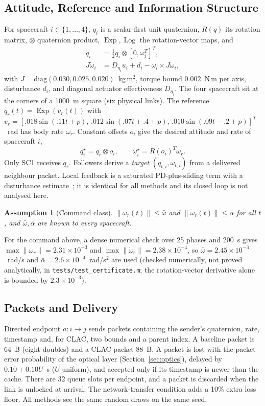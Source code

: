 \documentclass[journal]{IEEEtran}
\DeclareMathOperator{\Log}{Log}
\DeclareMathOperator{\Exp}{Exp}
\newtheorem{assumption}{Assumption}
\begin{document}
\subsection{Attitude, Reference and Information Structure}
For spacecraft $i\in\{1,\dots,4\}$, $q_i$ is a scalar-first unit quaternion, $R(q)$ its rotation matrix, $\otimes$ quaternion product, $\Exp,\Log$ the rotation-vector maps, and
\begin{align}
\dot q_i &= \tfrac12 q_i\otimes[0,\omega_i^T]^T,\\
J\dot\omega_i &= D_{\eta_i}u_i+d_i-\omega_i\times J\omega_i,
\end{align}
with $J=\mathrm{diag}(0.030,0.025,0.020)$~kg\,m$^2$, torque bound $0.002$~N\,m per axis, disturbance $d_i$, and diagonal actuator effectiveness $D_{\eta_i}$. The four spacecraft sit at the corners of a 1000~m square (six physical links). The reference $q_r(t)=\Exp(v_r(t))$ with $v_r=[.018\sin(.11t+p),\,.012\sin(.07t+.4+p),\,.010\sin(.09t-.2+p)]^T$~rad has body rate $\omega_r$. Constant offsets $o_i$ give the desired attitude and rate of spacecraft $i$,
\begin{equation}
q_i^\star=q_r\otimes o_i,\qquad \omega_i^\star=R(o_i)^T\omega_r .
\end{equation}
Only SC1 receives $q_r$. Followers derive a \emph{target} $(q_{t,i},\omega_{t,i})$ from a delivered neighbour packet. Local feedback is a saturated PD-plus-sliding term with a disturbance estimate~\cite{liu2018}; it is identical for all methods and its closed loop is not analysed here.

\begin{assumption}[Command class]\label{as:ref}
$\|\omega_r(t)\|\le\bar\omega$ and $\|\dot\omega_r(t)\|\le\bar\alpha$ for all $t$, and $\bar\omega,\bar\alpha$ are known to every spacecraft.
\end{assumption}
For the command above, a dense numerical check over 25 phases and 200~s gives $\max\|\omega_r\|=2.31\times10^{-3}$ and $\max\|\dot\omega_r\|=2.38\times10^{-4}$, so $\bar\omega=2.45\times10^{-3}$~rad/s and $\bar\alpha=2.6\times10^{-4}$~rad/s$^2$ are used (checked numerically, not proved analytically, in \texttt{tests/test\_certificate.m}; the rotation-vector derivative alone is bounded by $2.3\times10^{-3}$).

\subsection{Packets and Delivery}
Directed endpoint $a:i\to j$ sends packets containing the sender's quaternion, rate, timestamp and, for CLAC, two bounds and a parent index. A baseline packet is 64~B (eight doubles) and a CLAC packet 88~B. A packet is lost with the packet-error probability of the optical layer (Section~\ref{sec:optics}), delayed by $0.10+0.10U$~s ($U$ uniform), and accepted only if its timestamp is newer than the cache. There are 32 queue slots per endpoint, and a packet is discarded when the link is unlocked at arrival. The network-transfer condition adds a 10\% extra loss floor. All methods see the same random draws on the same seed.
\end{document}
